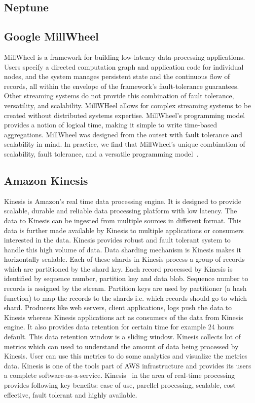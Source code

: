 \subsection{Neptune}

\pv

\subsection{Google MillWheel}

MillWheel is a framework for building low-latency data-processing
applications. Users specify a directed computation graph and
application code for individual nodes, and the system manages
persistent state and the continuous flow of records, all within the
envelope of the framework’s fault-tolerance guarantees. Other
streaming systems do not provide this combination of fault tolerance,
versatility, and scalability. MillWHeel allows for complex streaming
systems to be created without distributed systems
expertise. MillWheel’s programming model provides a notion of logical
time, making it simple to write time-based aggregations. MillWheel was
designed from the outset with fault tolerance and scalability in
mind. In practice, we find that MillWheel’s unique combination of
scalability, fault tolerance, and a versatile programming
model~\cite{millwheel-paper}.

\subsection{Amazon Kinesis}

Kinesis is Amazon’s real time data processing engine. It is designed
to provide scalable, durable and reliable data processing platform
with low latency\cite{www-kinesis}.  The data to Kinesis can be
ingested from multiple sources in different format. This data is
further made available by Kinesis to multiple applications or
consumers interested in the data. Kinesis provides robust and fault
tolerant system to handle this high volume of data. Data sharding
mechanism is Kinesis makes it horizontally scalable. Each of these
shards in Kinesis process a group of records which are partitioned by
the shard key. Each record processed by Kinesis is identified by
sequence number, partition key and data blob. Sequence number to
records is assigned by the stream. Partition keys are used by
partitioner (a hash function) to map the records to the shards
i.e. which records should go to which shard. Producers like web
servers, client applications, logs push the data to Kinesis whereas
Kinesis applications act as consumers of the data from Kinesis
engine. It also provides data retention for certain time for example
24 hours default. This data retention window is a sliding
window. Kinesis collects lot of metrics which can used to understand
the amount of data being processed by Kinesis.  User can use this
metrics to do some analytics and visualize the metrics data.  Kinesis
is one of the tools part of AWS infrastructure and provides its users
a complete
software-as-a-service. Kinesis~\cite{big-data-analytics-book} in the
area of real-time processing provides following key benefits: ease of
use, parellel processing, scalable, cost effective, fault tolerant and
highly available.

